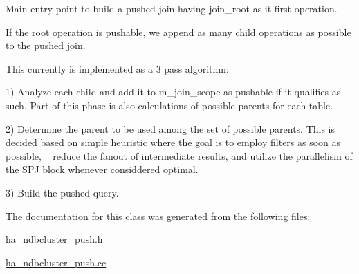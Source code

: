 Main entry point to build a pushed join having \textquotesingle{}join\+\_\+root\textquotesingle{} as it first operation.

If the root operation is pushable, we append as many \textquotesingle{}child\textquotesingle{} operations as possible to the pushed join.

This currently is implemented as a 3 pass algorithm\+:

1) Analyze each child and add it to \textquotesingle{}m\+\_\+join\+\_\+scope\textquotesingle{} as \textquotesingle{}pushable\textquotesingle{} if it qualifies as such. Part of this phase is also calculations of possible parents for each table.

2) Determine the parent to be used among the set of possible parents. This is decided based on simple heuristic where the goal is to employ filters as soon as possible, ~\newline
 reduce the fanout of intermediate results, and utilize the parallelism of the S\+PJ block whenever considdered optimal.

3) Build the pushed query. 

The documentation for this class was generated from the following files\+:\begin{DoxyCompactItemize}
\item 
ha\+\_\+ndbcluster\+\_\+push.\+h\item 
\mbox{\hyperlink{ha__ndbcluster__push_8cc}{ha\+\_\+ndbcluster\+\_\+push.\+cc}}\end{DoxyCompactItemize}
